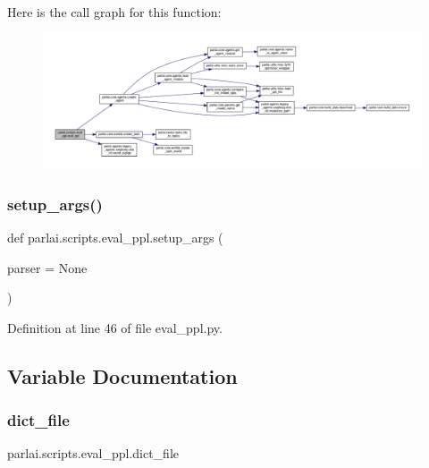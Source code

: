 Here is the call graph for this function\+:
\nopagebreak
\begin{figure}[H]
\begin{center}
\leavevmode
\includegraphics[width=350pt]{namespaceparlai_1_1scripts_1_1eval__ppl_ad1a8a8891f276136e82edc906ea58340_cgraph}
\end{center}
\end{figure}
\mbox{\label{namespaceparlai_1_1scripts_1_1eval__ppl_a4ae22cc04e19c46ed621afeba6e85d67}} 
\subsubsection{\texorpdfstring{setup\+\_\+args()}{setup\_args()}}
{\footnotesize\ttfamily def parlai.\+scripts.\+eval\+\_\+ppl.\+setup\+\_\+args (\begin{DoxyParamCaption}\item[{}]{parser = {\ttfamily None} }\end{DoxyParamCaption})}



Definition at line 46 of file eval\+\_\+ppl.\+py.



\subsection{Variable Documentation}
\mbox{\label{namespaceparlai_1_1scripts_1_1eval__ppl_a9f9177d01476851d8e9923f2c624fd4e}} 
\subsubsection{\texorpdfstring{dict\+\_\+file}{dict\_file}}
{\footnotesize\ttfamily parlai.\+scripts.\+eval\+\_\+ppl.\+dict\+\_\+file}



